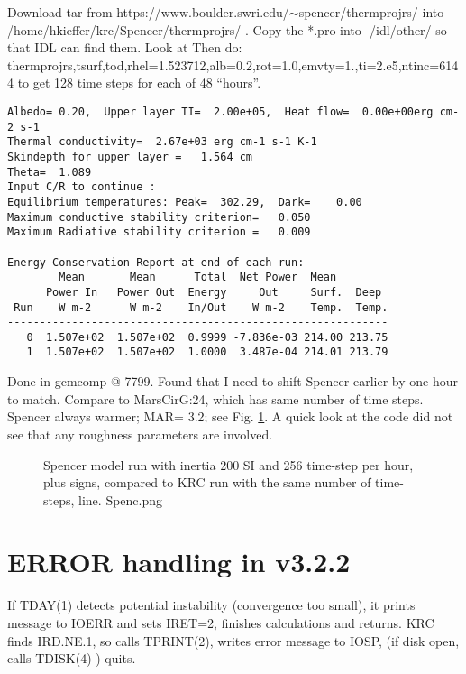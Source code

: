 \documentclass{article}
\begin{document}
 Download tar from https://www.boulder.swri.edu/$\sim$spencer/thermprojrs/ into
/home/hkieffer/krc/Spencer/thermprojrs/ . Copy the *.pro into -/idl/other/ so that IDL can find them. Look at  Then do:
\\ thermprojrs,tsurf,tod,rhel=1.523712,alb=0.2,rot=1.0,emvty=1.,ti=2.e5,ntinc=6144
\qi to get 128 time steps for each of 48 ``hours''.
\vspace{-3.mm} 
\begin{verbatim} 
Albedo= 0.20,  Upper layer TI=  2.00e+05,  Heat flow=  0.00e+00erg cm-2 s-1
Thermal conductivity=  2.67e+03 erg cm-1 s-1 K-1
Skindepth for upper layer =   1.564 cm
Theta=  1.089
Input C/R to continue : 
Equilibrium temperatures: Peak=  302.29,  Dark=    0.00
Maximum conductive stability criterion=   0.050
Maximum Radiative stability criterion =   0.009

Energy Conservation Report at end of each run:
        Mean       Mean      Total  Net Power  Mean
      Power In   Power Out  Energy     Out     Surf.  Deep
 Run    W m-2      W m-2    In/Out    W m-2    Temp.  Temp.
-----------------------------------------------------------
   0  1.507e+02  1.507e+02  0.9999 -7.836e-03 214.00 213.75
   1  1.507e+02  1.507e+02  1.0000  3.487e-04 214.01 213.79
\end{verbatim} 
 
Done in gcmcomp @ 7799. Found that I need to shift Spencer earlier by one hour to match. Compare to MarsCirG:24, which has same number of time steps. Spencer always warmer; MAR= 3.2; see Fig. \ref{Spenc}.  A quick look at the code did not see that any roughness parameters are involved.

\begin{figure}[!ht] 
\caption[Spencer model]{Spencer model run with inertia 200 SI and 256 time-step per hour, plus signs, compared to KRC run with the same number of time-steps, line.
\label{Spenc} Spenc.png }
\end{figure} 


\appendix %
\section{ERROR handling in v3.2.2}

If TDAY(1) detects potential instability (convergence too small), it prints message to IOERR and sets IRET=2, finishes calculations and returns.
\qi KRC finds IRD.NE.1, so calls TPRINT(2), writes error message to IOSP,
\qii (if disk open, calls TDISK(4) ) 
\qi quits.
\end{document}
